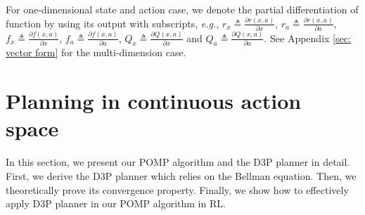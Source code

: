 \documentclass{article} %
\newcommand{\av}{\mathbf{a}}
\newtheorem{theorem}{Theorem}
\newcommand{\yue}[1]{ {#1}}
\begin{document}
\yue{  For one-dimensional state and action case, we denote the partial differentiation of function by using its output with subscripts, \emph{e.g.}, $r_x\triangleq\frac{ \partial r(x,a)  }{\partial x}$, $r_a\triangleq\frac{ \partial r(x,a)  }{\partial a}$, $f_x\triangleq\frac{ \partial f(x,a)  }{\partial x}$, $f_a\triangleq\frac{ \partial f(x,a)  }{\partial a}$, $Q_x\triangleq\frac{ \partial Q(x,a)  }{\partial x}$ and $Q_a\triangleq\frac{ \partial Q(x,a)  }{\partial a}$. See Appendix \ref{sec: vector form} for the multi-dimension case.}









\section{ Planning in continuous action space }

In this section, we present our POMP algorithm and the D3P planner in detail.  First, we derive the  D3P planner which relies on the Bellman equation. Then, we theoretically prove its convergence property. 
Finally, we show how to effectively apply D3P planner in our POMP algorithm in RL.


    
\end{document}
